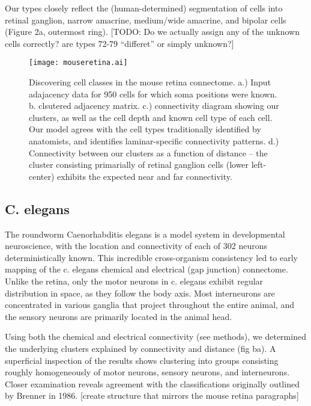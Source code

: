 \documentclass{article}
\begin{document}
Our types closely reflect the (human-determined) segmentation of cells
into retinal ganglion, narrow amacrine, medium/wide amacrine, and
bipolar cells (Figure 2a, outermost ring). [TODO: Do we actually
assign any of the unknown cells correctly? are types 72-79 “differet”
or simply unknown?]


\begin{figure}
  \centering 
  \centerline{\texttt{[image: mouseretina.ai]}}
  \caption{Discovering cell classes in the mouse retina connectome. 
a.) Input adajacency data for 950 cells for which soma positions were known. b. clsutered adjacency matrix. c.) connectivity diagram showing our clusters, as
well as the cell depth and known cell type of each cell. Our model agrees
with the cell types traditionally identified by anatomists, and identifies 
laminar-specific connectivity patterns. d.) Connectivity between our
clusters as a function of distance -- the cluster consisting primarially of
retinal ganglion cells (lower left-center) exhibits the expected near and
far connectivity.}
\end{figure}

\subsection{C. elegans}

The roundworm Caenorhabditis elegans is a model system in
developmental neuroscience\autocite{White1986}, with the location and
connectivity of each of 302 neurons deterministically known. This
incredible cross-organism consistency led to early mapping of the
c. elegans chemical and electrical (gap junction) connectome. Unlike
the retina, only the motor neurons in c. elegans exhibit regular
distribution in space, as they follow the body axis. Most interneurons
are concentrated in various ganglia that project throughout the entire
animal, and the sensory neurons are primarily located in the animal
head.

Using both the chemical and electrical connectivity (see methods), we
determined the underlying clusters explained by connectivity and
distance (fig ba). A superficial inspection of the results shows
clustering into groups consisting roughly homogeneously of motor
neurons, sensory neurons, and interneurons. Closer examination reveals
agreement with the classifications originally outlined by Brenner in
1986.  [create structure that mirrors the mouse retina paragraphs]
\end{document}
